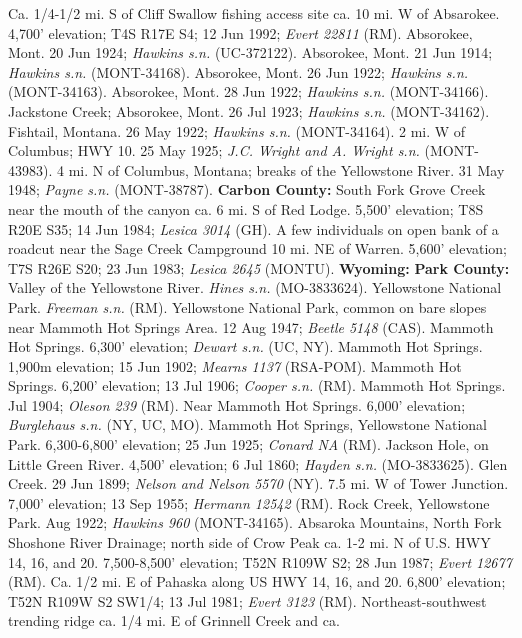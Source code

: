 Ca. 1/4-1/2 mi. S of Cliff Swallow fishing access site ca. 10 mi. W of
Absarokee. 4,700' elevation; T4S R17E S4; 12 Jun 1992;
\textit{Evert 22811} (RM).
Absorokee, Mont. 20 Jun 1924; \textit{Hawkins s.n.} (UC-372122).
Absorokee, Mont. 21 Jun 1914; \textit{Hawkins s.n.} (MONT-34168).
Absorokee, Mont. 26 Jun 1922; \textit{Hawkins s.n.} (MONT-34163).
Absorokee, Mont. 28 Jun 1922; \textit{Hawkins s.n.} (MONT-34166).
Jackstone Creek; Absorokee, Mont. 26 Jul 1923;
\textit{Hawkins s.n.} (MONT-34162).
Fishtail, Montana. 26 May 1922; \textit{Hawkins s.n.} (MONT-34164).
2 mi. W of Columbus; HWY 10. 25 May 1925;
\textit{J.C. Wright and A. Wright s.n.} (MONT-43983).
4 mi. N of Columbus, Montana; breaks of the Yellowstone River. 31 May 1948;
\textit{Payne s.n.} (MONT-38787).
  \textbf{Carbon County:}
South Fork Grove Creek near the mouth of the canyon ca. 6 mi. S of Red Lodge.
5,500' elevation; T8S R20E S35; 14 Jun 1984; \textit{Lesica 3014} (GH).
A few individuals on open bank of a roadcut near the Sage Creek Campground 10
mi. NE of Warren. 5,600' elevation; T7S R26E S20; 23 Jun 1983;
\textit{Lesica 2645} (MONTU).
  \textbf{Wyoming:}
  \textbf{Park County:}
Valley of the Yellowstone River. \textit{Hines s.n.} (MO-3833624).
Yellowstone National Park. \textit{Freeman s.n.} (RM).
Yellowstone National Park, common on bare slopes near Mammoth Hot Springs Area.
12 Aug 1947; \textit{Beetle 5148} (CAS).
Mammoth Hot Springs. 6,300' elevation; \textit{Dewart s.n.} (UC, NY).
Mammoth Hot Springs. 1,900m elevation; 15 Jun 1902;
\textit{Mearns 1137} (RSA-POM).
Mammoth Hot Springs. 6,200' elevation; 13 Jul 1906; \textit{Cooper s.n.} (RM).
Mammoth Hot Springs. Jul 1904; \textit{Oleson 239} (RM).
Near Mammoth Hot Springs. 6,000' elevation;
\textit{Burglehaus s.n.} (NY, UC, MO).
Mammoth Hot Springs, Yellowstone National Park. 6,300-6,800' elevation;
25 Jun 1925; \textit{Conard NA} (RM).
Jackson Hole, on Little Green River. 4,500' elevation; 6 Jul 1860;
\textit{Hayden s.n.} (MO-3833625).
Glen Creek. 29 Jun 1899; \textit{Nelson and Nelson 5570} (NY).
7.5 mi. W of Tower Junction. 7,000' elevation; 13 Sep 1955;
\textit{Hermann 12542} (RM).
Rock Creek, Yellowstone Park. Aug 1922; \textit{Hawkins 960} (MONT-34165).
Absaroka Mountains, North Fork Shoshone River Drainage; north side of Crow Peak
ca. 1-2 mi. N of U.S. HWY 14, 16, and 20. 7,500-8,500' elevation; T52N R109W S2;
28 Jun 1987; \textit{Evert 12677} (RM).
Ca. 1/2 mi. E of Pahaska along US HWY 14, 16, and 20. 6,800' elevation;
T52N R109W S2 SW1/4; 13 Jul 1981; \textit{Evert 3123} (RM).
Northeast-southwest trending ridge ca. 1/4 mi. E of Grinnell Creek and ca.
